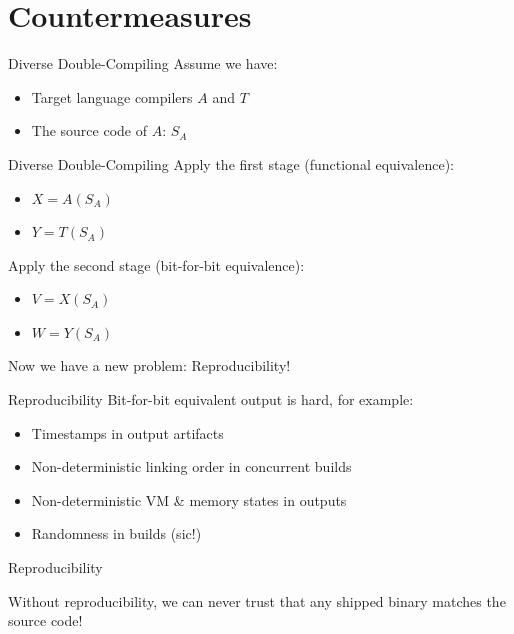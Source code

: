 \documentclass[12pt]{beamer}
\begin{document}
  \section{Countermeasures}

  \begin{frame}{Diverse Double-Compiling}
    Assume we have:

    \begin{itemize}
    \item Target language compilers $A$ and $T$
    \item The source code of $A$: $ S_{A} $
    \end{itemize}
  \end{frame}

  \begin{frame}{Diverse Double-Compiling}
    Apply the first stage (functional equivalence):

    \begin{itemize}
    \item $ X = A(S_{A})$
    \item $ Y = T(S_{A})$
    \end{itemize}

    Apply the second stage (bit-for-bit equivalence):

    \begin{itemize}
    \item $ V = X(S_{A})$
    \item $ W = Y(S_{A})$
    \end{itemize}

    Now we have a new problem: Reproducibility!
  \end{frame}

  \begin{frame}{Reproducibility}
    Bit-for-bit equivalent output is hard, for example:

    \begin{itemize}
    \item Timestamps in output artifacts
    \item Non-deterministic linking order in concurrent builds
    \item Non-deterministic VM \& memory states in outputs
    \item Randomness in builds (sic!)
    \end{itemize}
  \end{frame}

  \begin{frame}{Reproducibility}
    \begin{center}
      Without reproducibility, we can never trust that any shipped
      binary matches the source code!
    \end{center}
  \end{frame}
\end{document}
